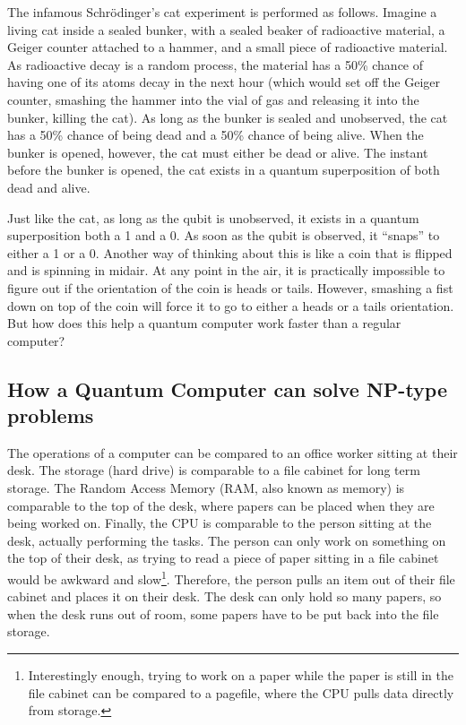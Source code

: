 \documentclass[10pt,journal,compsoc]{IEEEtran}
\begin{document}
The infamous Schr\"{o}dinger's cat experiment is performed as follows. Imagine a living cat inside a sealed bunker, with a sealed beaker of radioactive material, a Geiger counter attached to a hammer, and a small piece of radioactive material. As radioactive decay is a random process, the material has a 50\% chance of having one of its atoms decay in the next hour (which would set off the Geiger counter, smashing the hammer into the vial of gas and releasing it into the bunker, killing the cat). As long as the bunker is sealed and unobserved, the cat has a 50\% chance of being dead and a 50\% chance of being alive. When the bunker is opened, however, the cat must either be dead or alive. The instant before the bunker is opened, the cat exists in a quantum superposition of both dead and alive\cite{NatGeo}. 

Just like the cat, as long as the qubit is unobserved, it exists in a quantum superposition both a 1 and a 0. As soon as the qubit is observed, it ``snaps'' to either a 1 or a 0. Another way of thinking about this is like a coin that is flipped and is  spinning in midair. At any point in the air, it is practically impossible to figure out if the orientation of the coin is heads or tails. However, smashing a fist down on top of the coin will force it to go to either a heads or a tails orientation. But how does this help a quantum computer work faster than a regular computer?



\subsection{How a Quantum Computer can solve NP-type problems}

The operations of a computer can be compared to an office worker sitting at their desk. The storage (hard drive) is comparable to a file cabinet for long term storage. The Random Access Memory (RAM, also known as memory) is comparable to the top of the desk, where papers can be placed when they are being worked on. Finally, the CPU is comparable to the person sitting at the desk, actually performing the tasks. The person can only work on something on the top of their desk, as trying to read a piece of paper sitting in a file cabinet would be awkward and slow\footnote{Interestingly enough, trying to work on a paper while the paper is still in the file cabinet can be compared to a pagefile, where the CPU pulls data directly from storage.}. Therefore, the person pulls an item out of their file cabinet and places it on their desk. The desk can only hold so many papers, so when the desk runs out of room, some papers have to be put back into the file storage. 
\end{document}
